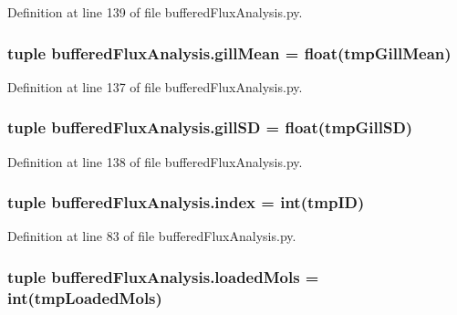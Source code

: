 Definition at line 139 of file buffered\-Flux\-Analysis.\-py.

\hypertarget{namespacebuffered_flux_analysis_ab95141737b50ec6e5b0e3f622dfa9713}{
\subsubsection[{gill\-Mean}]{\setlength{\rightskip}{0pt plus 5cm}tuple buffered\-Flux\-Analysis.\-gill\-Mean = float(tmp\-Gill\-Mean)}}\label{namespacebuffered_flux_analysis_ab95141737b50ec6e5b0e3f622dfa9713}


Definition at line 137 of file buffered\-Flux\-Analysis.\-py.

\hypertarget{namespacebuffered_flux_analysis_a74dcc41e82d94dda58e3e18fd94b9563}{
\subsubsection[{gill\-S\-D}]{\setlength{\rightskip}{0pt plus 5cm}tuple buffered\-Flux\-Analysis.\-gill\-S\-D = float(tmp\-Gill\-S\-D)}}\label{namespacebuffered_flux_analysis_a74dcc41e82d94dda58e3e18fd94b9563}


Definition at line 138 of file buffered\-Flux\-Analysis.\-py.

\hypertarget{namespacebuffered_flux_analysis_af7658ba15697dfeb9cd4bff8a57c7360}{
\subsubsection[{index}]{\setlength{\rightskip}{0pt plus 5cm}tuple buffered\-Flux\-Analysis.\-index = int(tmp\-I\-D)}}\label{namespacebuffered_flux_analysis_af7658ba15697dfeb9cd4bff8a57c7360}


Definition at line 83 of file buffered\-Flux\-Analysis.\-py.

\hypertarget{namespacebuffered_flux_analysis_ae753e3b6694200ad57523072a4a2dbf1}{
\subsubsection[{loaded\-Mols}]{\setlength{\rightskip}{0pt plus 5cm}tuple buffered\-Flux\-Analysis.\-loaded\-Mols = int(tmp\-Loaded\-Mols)}}\label{namespacebuffered_flux_analysis_ae753e3b6694200ad57523072a4a2dbf1}


